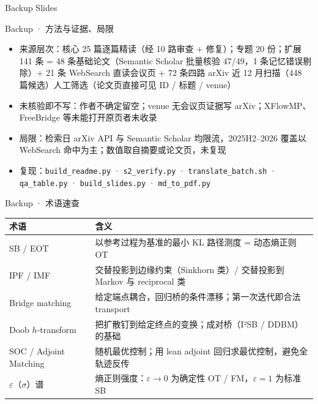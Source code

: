 \documentclass[aspectratio=169,10pt]{beamer}
\begin{document}
\appendix
\begin{frame}{Backup Slides}\end{frame}
\begin{frame}{Backup · 方法与证据、局限}
\begin{itemize}
\item 来源层次：核心 25 篇逐篇精读（经 10 路审查 + 修复）；专题 20 份；扩展 141 条 = 48 条基础论文（Semantic Scholar 批量核验 47/49，1 条记忆错误剔除）+ 21 条 WebSearch 直读会议页 + 72 条四路 arXiv 近 12 月扫描（448 篇候选）人工筛选（论文页直接可见 ID / 标题 / venue）
\item 未核验即不写：作者不确定留空；venue 无会议页证据写 arXiv；XFlowMP、FreeBridge 等未能打开原页者未收录
\item 局限：检索日 arXiv API 与 Semantic Scholar 均限流，2025H2--2026 覆盖以 WebSearch 命中为主；数值取自摘要或论文页，未复现
\item 复现：\texttt{build\_readme.py} · \texttt{s2\_verify.py} · \texttt{translate\_batch.sh} · \texttt{qa\_table.py} · \texttt{build\_slides.py} · \texttt{md\_to\_pdf.py}
\end{itemize}
\end{frame}
\begin{frame}{Backup · 术语速查}
\begin{center}\small\begin{tabular}{P{3.2cm}p{9.5cm}}\toprule
术语 & 含义 \\\midrule
SB / EOT & 以参考过程为基准的最小 KL 路径测度 = 动态熵正则 OT \\
IPF / IMF & 交替投影到边缘约束（Sinkhorn 类）/ 交替投影到 Markov 与 reciprocal 类 \\
Bridge matching & 给定端点耦合，回归桥的条件漂移；第一次迭代即合法 transport \\
Doob $h$-transform & 把扩散钉到给定终点的变换；成对桥（I²SB / DDBM）的基础 \\
SOC / Adjoint Matching & 随机最优控制；用 lean adjoint 回归求最优控制，避免全轨迹反传 \\
$\varepsilon$（$\sigma$）谱 & 熵正则强度：$\varepsilon\to 0$ 为确定性 OT / FM，$\varepsilon=1$ 为标准 SB \\\bottomrule
\end{tabular}\end{center}
\end{frame}
\end{document}
